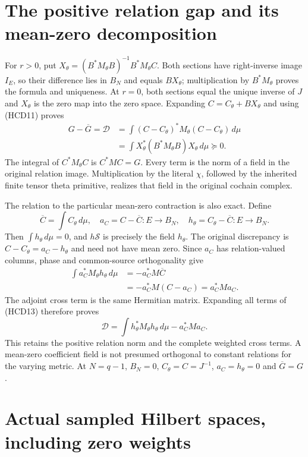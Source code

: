 \section{The positive relation gap and its mean-zero decomposition}

For $r>0$, put
$X_\theta=(B^*M_\theta B)^{-1}B^*M_\theta C$.
Both sections have right-inverse image $I_E$, so their difference
lies in $B_N$ and equals $BX_\theta$; multiplication by
$B^*M_\theta$ proves the formula and uniqueness.
At $r=0$, both sections equal the unique inverse of $J$ and
$X_\theta$ is the zero map into the zero space.
Expanding $C=C_\theta+BX_\theta$ and using (HCD11) proves
\[
 \boxed{
 \begin{aligned}
 G-\overline G=\mathscr D
 &=\int(C-C_\theta)^*M_\theta(C-C_\theta)\,d\mu\\
 &=\int X_\theta^*(B^*M_\theta B)X_\theta\,d\mu\succeq0.
 \end{aligned}}
 \tag{HCD13}
\]
The integral of $C^*M_\theta C$ is $C^*MC=G$.
Every term is the norm of a field in the original relation
image. Multiplication by the literal $\chi$, followed by
the inherited finite tensor theta primitive, realizes
that field in the original cochain complex.

The relation to the particular mean-zero contraction is also exact.
Define
\[
 \overline C=\int C_\theta\,d\mu,\quad
 a_C=C-\overline C:E\to B_N,\quad
 h_\theta=C_\theta-\overline C:E\to B_N.
 \tag{HCD14}
\]
Then $\int h_\theta\,d\mu=0$, and $h\mathscr S$ is precisely
the field $h_\theta$. The original discrepancy is
$C-C_\theta=a_C-h_\theta$ and need not have mean zero.
Since $a_C$ has relation-valued columns, phase and
common-source orthogonality give
\[
 \begin{split}
 \int a_C^*M_\theta h_\theta\,d\mu
 &=-a_C^*M\overline C\\
 &=-a_C^*M(C-a_C)=a_C^*Ma_C.
 \end{split}
 \tag{HCD15}
\]
The adjoint cross term is the same Hermitian matrix.
Expanding all terms of (HCD13) therefore proves
\[
 \boxed{\mathscr D
 =\int h_\theta^*M_\theta h_\theta\,d\mu-a_C^*Ma_C.}
 \tag{HCD16}
\]
This retains the positive relation norm and the complete
weighted cross terms. A mean-zero coefficient field is
not presumed orthogonal to constant relations for the
varying metric. At $N=q-1$, $B_N=0$,
$C_\theta=C=J^{-1}$, $a_C=h_\theta=0$ and $\overline G=G$.

\section{Actual sampled Hilbert spaces, including zero weights}

